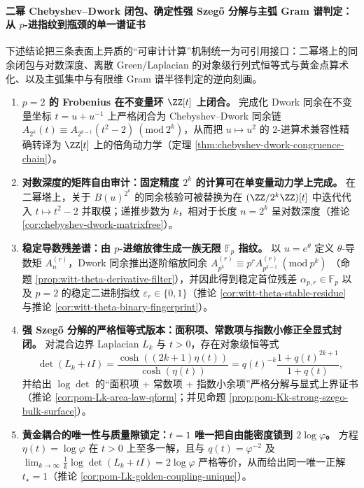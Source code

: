 \paragraph{二幂 Chebyshev--Dwork 闭包、确定性强 Szeg\H{o} 分解与主弧 Gram 谱判定：从 \texorpdfstring{$p$}{p}-进指纹到瓶颈的单一谱证书}
下述结论把三条表面上异质的“可审计计算”机制统一为可引用接口：二幂塔上的同余闭包与对数深度、离散 Green/Laplacian 的对象级行列式恒等式与黄金点算术化、以及主弧集中与有限维 Gram 谱半径判定的逆向刻画。
\begin{enumerate}
  \item \textbf{\texorpdfstring{$p=2$}{p=2} 的 Frobenius 在不变量环 \texorpdfstring{$\ZZ[t]$}{Z[t]} 上闭合。}
  完成化 Dwork 同余在不变量坐标 \(t=u+u^{-1}\) 上严格闭合为 Chebyshev--Dwork 同余链
  \(
  A_{2^k}(t)\equiv A_{2^{k-1}}(t^2-2)\ (\mathrm{mod}\ 2^k)
  \)，从而把 \(u\mapsto u^2\) 的 \(2\)-进算术兼容性精确转译为 \(\ZZ[t]\) 上的倍角动力学（定理 \ref{thm:chebyshev-dwork-congruence-chain}）。

  \item \textbf{对数深度的矩阵自由审计：固定精度 \texorpdfstring{$2^k$}{2^k} 的计算可在单变量动力学上完成。}
  在二幂塔上，关于 \(B(u)^{2^k}\) 的同余核验可被替换为在 \((\ZZ/2^k\ZZ)[t]\) 中迭代代入 \(t\mapsto t^2-2\) 并取模；递推步数为 \(k\)，相对于长度 \(n=2^k\) 呈对数深度（推论 \ref{cor:chebyshev-dwork-matrixfree}）。

  \item \textbf{稳定导数残差谱：由 \texorpdfstring{$p$}{p}-进缩放律生成一族无限 \texorpdfstring{$\mathbb{F}_p$}{F_p} 指纹。}
  以 \(u=e^\theta\) 定义 \(\theta\)-导数矩 \(A^{(r)}_n\)，Dwork 同余推出逐阶缩放同余
  \(A^{(r)}_{p^k}\equiv p^rA^{(r)}_{p^{k-1}}\ (\mathrm{mod}\ p^k)\)
  （命题 \ref{prop:witt-theta-derivative-filter}），并因此得到稳定首位残差
  \(\alpha_{p,r}\in\mathbb{F}_p\) 以及 \(p=2\) 的稳定二进制指纹 \(\varepsilon_r\in\{0,1\}\)（推论 \ref{cor:witt-theta-stable-residue} 与推论 \ref{cor:witt-theta-binary-fingerprint}）。

  \item \textbf{强 Szeg\H{o} 分解的严格恒等式版本：面积项、常数项与指数小修正全显式封闭。}
  对混合边界 Laplacian \(L_k\) 与 \(t>0\)，存在对象级恒等式
  \[
  \det(L_k+tI)=\frac{\cosh((2k+1)\eta(t))}{\cosh(\eta(t))}
  =q(t)^{-k}\frac{1+q(t)^{2k+1}}{1+q(t)},
  \]
  并给出 \(\log\det\) 的“面积项 + 常数项 + 指数小余项”严格分解与显式上界证书（推论 \ref{cor:pom-Lk-area-law-qform}；并见命题 \ref{prop:pom-Kk-strong-szego-bulk-surface}）。

  \item \textbf{黄金耦合的唯一性与质量隙锁定：\texorpdfstring{$t=1$}{t=1} 唯一把自由能密度锁到 \texorpdfstring{$2\log\varphi$}{2 log phi}。}
  方程 \(\eta(t)=\log\varphi\) 在 \(t>0\) 上至多一解，且与 \(q(t)=\varphi^{-2}\) 及
  \(\lim_{k\to\infty}\frac1k\log\det(L_k+tI)=2\log\varphi\)
  严格等价，从而给出同一唯一正解 \(t_\star=1\)（推论 \ref{cor:pom-Lk-golden-coupling-unique}）。


\end{enumerate}
